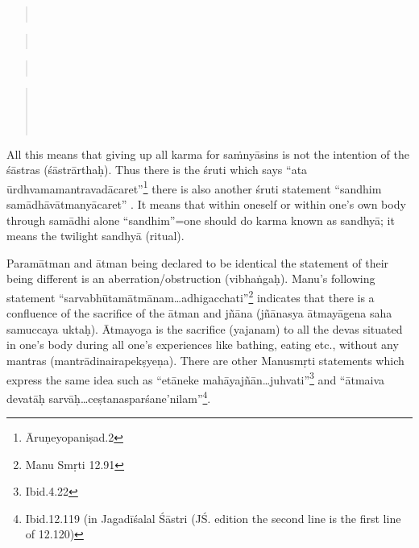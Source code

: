 \begin{verse}
\\
\end{verse}
\begin{verse}
\\
\end{verse}
\begin{verse}
\\
\end{verse}
\begin{verse}
\\
\\[3pt]
\\
\end{verse}

All this means that giving up all karma for saṁnyāsins is not the intention of the śāstras (śāstrārthaḥ). Thus there is the śruti which says “ata ūrdhvamamantravadācaret”\footnote{Āruṇeyopaniṣad.2}   there is also another śruti statement “sandhim samādhāvātmanyācaret” . It means that within oneself or within one’s own body through samādhi alone “sandhim”=one should do karma known as sandhyā; it means the twilight sandhyā (ritual). 

Paramātman and ātman being declared to be identical the statement of their being different is an aberration/obstruction (vibhaṅgaḥ). Manu’s following statement “sarvabhūtamātmānam…adhigacchati”\footnote{Manu Smṛti 12.91} indicates that there is a confluence of the sacrifice of the ātman and jñāna (jñānasya ātmayāgena saha samuccaya uktaḥ). Ātmayoga is the sacrifice (yajanam) to all the devas situated in one’s body during all one’s experiences like bathing, eating etc., without any mantras (mantrādinairapekṣyeṇa). There are other Manusmṛti statements which express the same idea such as “etāneke mahāyajñān…juhvati”\footnote{Ibid.4.22} and “ātmaiva devatāḥ sarvāḥ…ceṣtanasparśane’nilam”\footnote{Ibid.12.119  (in Jagadīśalal Śāstri (JŚ. edition the second line is the first line of 12.120)}.

